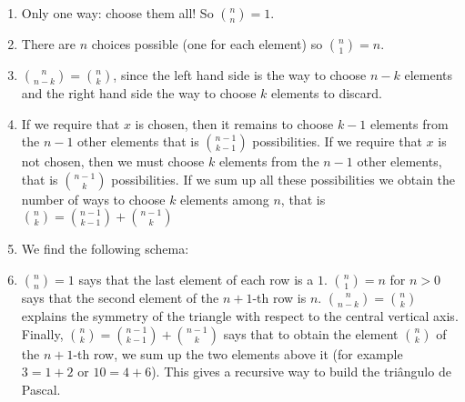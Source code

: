 \begin{enumerate}
  \item Only one way: choose them all! So $\binom{n}{n} = 1$.
  \item There are $n$ choices possible (one for each element) so
    $\binom{n}{1} = n$.

  \item $\binom{n}{n - k} = \binom{n}{k}$, since the left hand side is the
    way to choose $n - k$ elements and the right hand side the way to choose
    $k$ elements to discard.

  \item If we require that $x$ is chosen, then it remains to choose $k-1$
    elements from the $n-1$ other elements that is
    $\binom{n-1}{k-1}$ possibilities.
    If we require that $x$ is not chosen, then we must
    choose $k$ elements from the $n-1$ other elements, that is
    $\binom{n-1}{k}$ possibilities.
    If we sum up all these possibilities we obtain the number of ways to choose
    $k$ elements among $n$, that is
    $\binom{n}{k} = \binom{n-1}{k-1} + \binom{n-1}{k}$

  \item We find the following schema:
    \begin{center}
    \end{center}

\item $\binom{n}{n} = 1$ says that the last element of each row is a $1$.
  $\binom{n}{1} = n$ for $n > 0$ says that the second element of the
  $n+1$-th row is $n$. $\binom{n}{n - k} = \binom{n}{k}$ explains the symmetry
  of the triangle with respect to the central vertical axis.
  Finally, $\binom{n}{k} = \binom{n-1}{k-1} + \binom{n-1}{k}$ says that to
  obtain the element $\binom{n}{k}$ of the $n+1$-th row, we sum up the two
  elements above it (for example $3=1+2$ or $10 = 4+6$). This gives a recursive
  way to build the triângulo de Pascal.

\end{enumerate}

